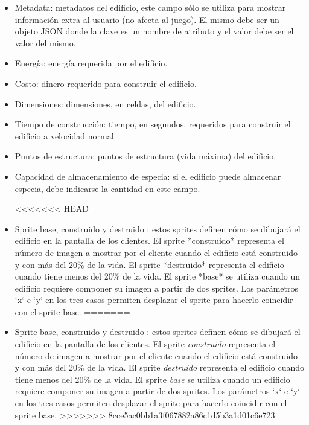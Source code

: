 \documentclass[titlepage,a4paper,12pt]{article}
\begin{document}
\begin{itemize}
\begin{itemize}
\item Metadata: metadatos del edificio, este campo sólo se utiliza para mostrar información extra al usuario (no afecta al juego). El mismo debe ser un objeto JSON donde la clave es un nombre de atributo y el valor debe ser el valor del mismo.

\item Energía: energía requerida por el edificio.

\item Costo: dinero requerido para construir el edificio.

\item Dimensiones: dimensiones, en celdas, del edificio.

\item Tiempo de construcción: tiempo, en segundos, requeridos para construir el edificio a velocidad normal.

\item Puntos de estructura: puntos de estructura (vida máxima) del edificio.

\item Capacidad de almacenamiento de especia: si el edificio puede almacenar especia, debe indicarse la cantidad en este campo.

<<<<<<< HEAD
\item Sprite base, construido y destruido : estos sprites definen cómo se dibujará el edificio en la pantalla de los clientes. El sprite *construido* representa el número de imagen a mostrar por el cliente cuando el edificio está construido y con más del 20\% de la vida. El sprite *destruido* representa el edificio cuando tiene menos del 20\% de la vida. El sprite *base* se utiliza cuando un edificio requiere componer su imagen a partir de dos sprites. Los parámetros `x` e `y` en los tres casos permiten desplazar el sprite para hacerlo coincidir con el sprite base.
=======
\item Sprite base, construido y destruido : estos sprites definen cómo se dibujará el edificio en la pantalla de los clientes. El sprite \textit{construido} representa el número de imagen a mostrar por el cliente cuando el edificio está construido y con más del 20\% de la vida. El sprite \textit{destruido} representa el edificio cuando tiene menos del 20\% de la vida. El sprite \textit{base} se utiliza cuando un edificio requiere componer su imagen a partir de dos sprites. Los parámetros `x` e `y` en los tres casos permiten desplazar el sprite para hacerlo coincidir con el sprite base.
>>>>>>> 8cce5ac0bb1a3f067882a86c1d5b3a1d01c6e723


\end{itemize}
\end{itemize}
\end{document}
